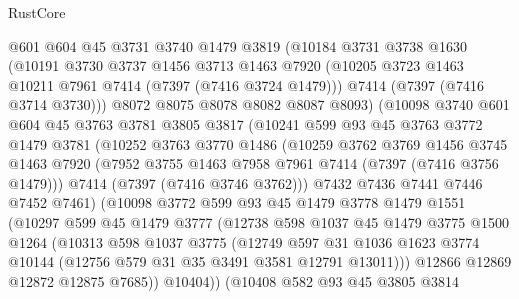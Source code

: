 \begin{lexlean}{RustCore}
\begin{coremodule}
          @601
          @604
          @45
          @3731
          @3740
          @1479
          @3819
          (@10184
            @3731
            @3738
            @1630
            (@10191
              @3730
              @3737
              @1456
              @3713
              @1463
              @7920
              (@10205 @3723 @1463 @10211 @7961 @7414 (@7397 (@7416 @3724 @1479)))
              @7414
              (@7397 (@7416 @3714 @3730)))
            @8072
            @8075
            @8078
            @8082
            @8087
            @8093)
          (@10098
            @3740
            @601
            @604
            @45
            @3763
            @3781
            @3805
            @3817
            (@10241
              @599
              @93
              @45
              @3763
              @3772
              @1479
              @3781
              (@10252
                @3763
                @3770
                @1486
                (@10259
                  @3762
                  @3769
                  @1456
                  @3745
                  @1463
                  @7920
                  (@7952 @3755 @1463 @7958 @7961 @7414 (@7397 (@7416 @3756 @1479)))
                  @7414
                  (@7397 (@7416 @3746 @3762)))
                @7432
                @7436
                @7441
                @7446
                @7452
                @7461)
              (@10098
                @3772
                @599
                @93
                @45
                @1479
                @3778
                @1479
                @1551
                (@10297
                  @599
                  @45
                  @1479
                  @3777
                  (@12738
                    @598
                    @1037
                    @45
                    @1479
                    @3775
                    @1500
                    @1264
                    (@10313
                      @598
                      @1037
                      @3775
                      (@12749
                        @597
                        @31
                        @1036
                        @1623
                        @3774
                        @10144
                        (@12756 @579 @31 @35 @3491 @3581 @12791 @13011)))
                    @12866
                    @12869
                    @12872
                    @12875
                    @7685))
                @10404))
            (@10408
              @582
              @93
              @45
              @3805
              @3814

\end{coremodule}
\end{lexlean}
